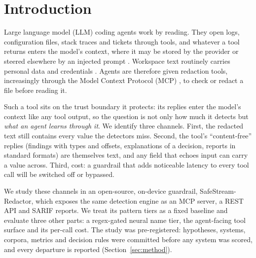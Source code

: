 \documentclass[conference]{IEEEtran}
\begin{document}
\section{Introduction}\label{sec:intro}

Large language model (LLM) coding agents work by reading. They open logs, configuration files, stack traces and tickets through tools, and whatever a tool returns enters the model's context, where it may be stored by the provider or steered elsewhere by an injected prompt \cite{greshake2023injection,debenedetti2024agentdojo}. Workspace text routinely carries personal data and credentials \cite{meli2019git}. Agents are therefore given redaction tools, increasingly through the Model Context Protocol (MCP) \cite{mcpspec}, to check or redact a file before reading it.

Such a tool sits on the trust boundary it protects: its replies enter the model's context like any tool output, so the question is not only how much it detects but \emph{what an agent learns through it}. We identify three channels. First, the redacted text still contains every value the detectors miss. Second, the tool's ``content-free'' replies (findings with types and offsets, explanations of a decision, reports in standard formats) are themselves text, and any field that echoes input can carry a value across. Third, cost: a guardrail that adds noticeable latency to every tool call will be switched off or bypassed.

We study these channels in an open-source, on-device guardrail, SafeStream-Redactor, which exposes the same detection engine as an MCP server, a REST API and SARIF reports. We treat its pattern tiers as a fixed baseline and evaluate three other parts: a regex-gated neural name tier, the agent-facing tool surface and its per-call cost. The study was pre-registered: hypotheses, systems, corpora, metrics and decision rules were committed before any system was scored, and every departure is reported (Section~\ref{sec:method}).
\end{document}
